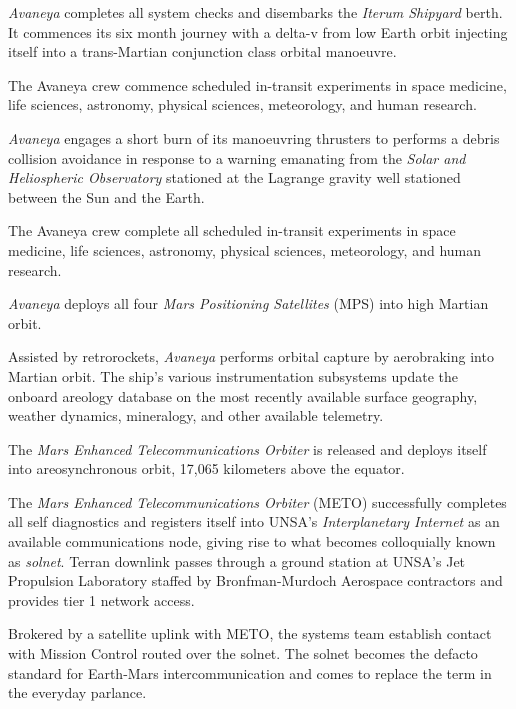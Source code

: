 {\it Avaneya} completes all system checks and disembarks the {\it Iterum Shipyard} berth. It commences its six month journey with a delta-v from low Earth orbit injecting itself into a trans-Martian conjunction class orbital manoeuvre.
\StopTimelineDate

The Avaneya crew commence scheduled in-transit experiments in space medicine, life sciences, astronomy, physical sciences, meteorology, and human research.
\StopTimelineDate

{\it Avaneya} engages a short burn of its manoeuvring thrusters to performs a debris collision avoidance in response to a warning emanating from the {\it Solar and Heliospheric Observatory} stationed at the Lagrange  gravity well stationed between the Sun and the Earth.
\StopTimelineDate

The Avaneya crew complete all scheduled in-transit experiments in space medicine, life sciences, astronomy, physical sciences, meteorology, and human research.
\StopTimelineDate

{\it Avaneya} deploys all four {\it Mars Positioning Satellites} (MPS) into high Martian orbit.
\StopTimelineDate

Assisted by retrorockets, {\it Avaneya} performs orbital capture by aerobraking into Martian orbit. The ship's various instrumentation subsystems update the onboard areology database on the most recently available surface geography, weather dynamics, mineralogy, and other available telemetry.

The {\it Mars Enhanced Telecommunications Orbiter} is released and deploys itself into areosynchronous orbit, 17,065 kilometers above the equator.

The {\it Mars Enhanced Telecommunications Orbiter} (METO) successfully completes all self diagnostics and registers itself into UNSA's {\it Interplanetary Internet} as an available communications node, giving rise to what becomes colloquially known as {\it solnet}. Terran downlink passes through a ground station at UNSA's Jet Propulsion Laboratory staffed by Bronfman-Murdoch Aerospace contractors and provides tier 1 network access.

Brokered by a satellite uplink with METO, the systems team establish contact with Mission Control routed over the solnet. The solnet becomes the defacto standard for Earth-Mars intercommunication and comes to replace the term  in the everyday parlance.
\StopTimelineDate

